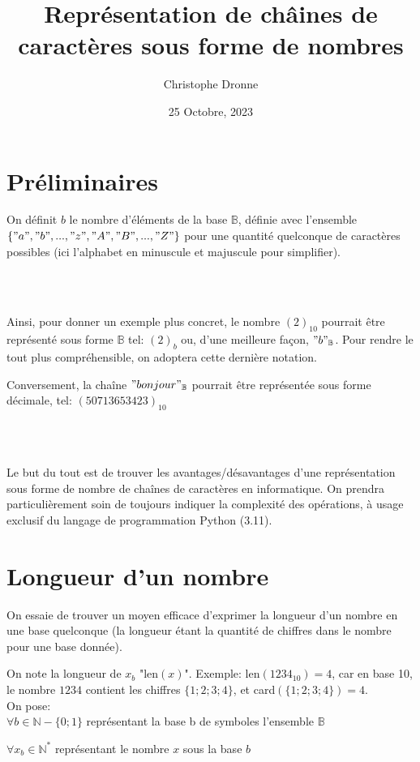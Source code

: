 \documentclass[a4paper, 12pt]{article}
\title{\vspace{-4cm}Représentation de châines de caractères sous forme de nombres}
\author{Christophe Dronne}
\date{25 Octobre, 2023}
\begin{document}
\maketitle

\section*{Préliminaires}
On définit $b$ le nombre d'éléments de la base $\mathbb{B}$, définie avec l'ensemble
$\{"a", "b", ..., "z", "A", "B", ..., "Z"\}$ pour une quantité quelconque de caractères possibles (ici l'alphabet en minuscule et majuscule pour simplifier).

\\\

Ainsi, pour donner un exemple plus concret, le nombre $(2)_{10}$ pourrait être représenté sous forme $\mathbb{B}$ tel: $(2)_{b}$ ou, d'une meilleure façon, $"b"_{\mathbb{B}}$. Pour rendre le tout plus compréhensible, on adoptera cette dernière notation.

Conversement, la chaîne $"bonjour"_{\mathbb{B}}$ pourrait être
représentée sous forme décimale, tel: $(50713653423)_{10}$

\\\

Le but du tout est de trouver les avantages/désavantages d'une représentation sous forme de nombre de chaînes de caractères en informatique. On prendra particulièrement soin de toujours indiquer la complexité des opérations, à usage exclusif du langage de programmation Python (3.11).

\section*{Longueur d'un nombre}
On essaie de trouver un moyen efficace d'exprimer la longueur d'un nombre en une base quelconque (la longueur étant la quantité de chiffres dans le nombre pour une base donnée).

On note la longueur de $x_{b}$ "len$(x)$". Exemple: len$(1234_{10}) = 4$, car en base 10, le nombre $1234$ contient les chiffres $\{1; 2; 3; 4\}$, et card$(\{1; 2; 3; 4\}) = 4$.
\\

On pose: \\

$\forall b \in \mathbb{N} - \{0; 1\}$ représentant la base b de symboles l'ensemble $\mathbb{B}$

$\forall x_{b} \in \mathbb{N}^{*}$ représentant le nombre $x$ sous la base $b$
\end{document}
